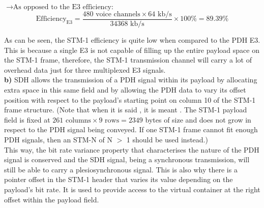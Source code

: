 $\rightarrow\text{As opposed to the E3 efficiency:}$\\
$$\text{Efficiency}_{\text{E3}} = \frac{480 \text{ voice channels}\times 64\text{ kb/s}}{34368\text{ kb/s}}\times 100\% = \mathbf{89.39}\%$$

As can be seen, the STM-1 efficiency is quite low when compared to the PDH E3. This is because a single E3 is not capable of filling up the entire payload space on the STM-1 frame, therefore, the STM-1 transmission channel will carry a lot of overhead data just for three multiplexed E3 signals.\\

\large\textbf{b)} \normalsize
SDH allows the transmission of a PDH signal within its payload by allocating extra space in this same field and by allowing the PDH data to vary its offset position with respect to the payload's starting point on column 10 of the STM-1 frame structure. (Note that when it is said , it is meant . The STM-1 payload field is fixed at $261 \text{ columns}\times 9 \text{ rows} = 2349$ bytes of size and does not grow in respect to the PDH signal being conveyed. If one STM-1 frame cannot fit enough PDH signals, then an STM-N of N $>$ 1 should be used instead.)\\

This way, the bit rate variance property that characterises the nature of the PDH signal is conserved and the SDH signal, being a synchronous transmission, will still be able to carry a plesiosynchronous signal. This is also why there is a pointer offset in the STM-1 header that varies its value depending on the payload's bit rate. It is used to provide access to the virtual container at the right offset within the payload field.\\

